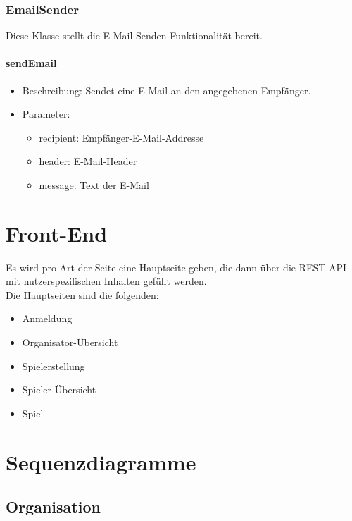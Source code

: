 \documentclass[a4paper]{scrreprt}
\begin{document}
    \subsection{EmailSender}
    Diese Klasse stellt die E-Mail Senden Funktionalität bereit.
    \subsubsection{sendEmail}
    \begin{itemize}
        \item Beschreibung: Sendet eine E-Mail an den angegebenen Empfänger.
        \item Parameter:
        \begin{itemize}
            \item recipient: Empfänger-E-Mail-Addresse
            \item header: E-Mail-Header
            \item message: Text der E-Mail
        \end{itemize}
    \end{itemize}




    \chapter{Front-End}
    Es wird pro Art der Seite eine Hauptseite geben, die dann über die REST-API mit nutzerspezifischen Inhalten gefüllt werden. \\
    Die Hauptseiten sind die folgenden: \\
    \begin{itemize}
        \item   Anmeldung
        \item   Organisator-Übersicht
        \item   Spielerstellung
        \item   Spieler-Übersicht
        \item   Spiel
    \end{itemize}


    \chapter{Sequenzdiagramme}

    \section{Organisation}
\end{document}
